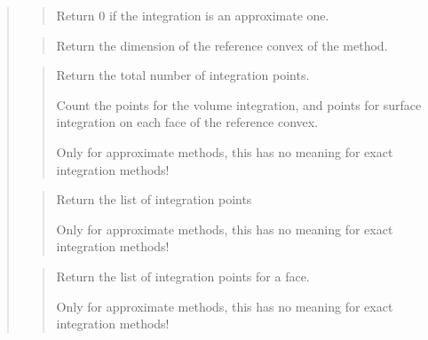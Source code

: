 \documentclass[a4paper,11pt,english]{sphinxmanual}
\begin{document}
\sphinxAtStartPar
{}
\begin{quote}

\sphinxAtStartPar
{}
\begin{quote}

\sphinxAtStartPar
Return 0 if the integration is an approximate one.
\end{quote}

\sphinxAtStartPar
{}
\begin{quote}

\sphinxAtStartPar
Return the dimension of the reference convex of
the method.
\end{quote}

\sphinxAtStartPar
{}
\begin{quote}

\sphinxAtStartPar
Return the total number of integration points.

\sphinxAtStartPar
Count the points for the volume integration, and points for
surface integration on each face of the reference convex.

\sphinxAtStartPar
Only for approximate methods, this has no meaning for exact
integration methods!
\end{quote}

\sphinxAtStartPar
{}
\begin{quote}

\sphinxAtStartPar
Return the list of integration points

\sphinxAtStartPar
Only for approximate methods, this has no meaning for exact
integration methods!
\end{quote}

\sphinxAtStartPar
{}
\begin{quote}

\sphinxAtStartPar
Return the list of integration points for a face.

\sphinxAtStartPar
Only for approximate methods, this has no meaning for exact
integration methods!
\end{quote}


\end{quote}
\end{document}
